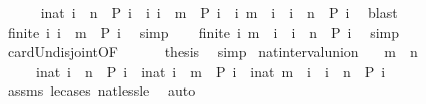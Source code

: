 \begin{isabellebody}
\ {}{\isacharcolon}\isanewline
\ \ \ \ {\isacartoucheopen}{\isacharbraceleft}i{\isacharcolon}{\isacharcolon}nat{\isachardot}\ i\ {\isacharless}\ n\ {\isasymand}\ P\ i{\isacharbraceright}\ {\isacharequal}\ {\isacharbraceleft}i{\isachardot}\ i\ {\isacharless}\ m\ {\isasymand}\ P\ i{\isacharbraceright}\ {\isasymunion}\ {\isacharbraceleft}i{\isachardot}\ m\ {\isasymle}\ i\ {\isasymand}\ i\ {\isacharless}\ n\ {\isasymand}\ P\ i{\isacharbraceright}{\isacartoucheclose}\ \isamarkupfalse%
\ blast\isanewline
\ \ \isamarkupfalse%
\ {}{\isacharcolon}{\isacartoucheopen}finite\ {\isacharbraceleft}i{\isachardot}\ i\ {\isacharless}\ m\ {\isasymand}\ P\ i{\isacharbraceright}{\isacartoucheclose}\ \isamarkupfalse%
\ simp\isanewline
\ \ \isamarkupfalse%
\ {}{\isacharcolon}{\isacartoucheopen}finite\ {\isacharbraceleft}i{\isachardot}\ m\ {\isasymle}\ i\ {\isasymand}\ i\ {\isacharless}\ n\ {\isasymand}\ P\ i{\isacharbraceright}{\isacartoucheclose}\ \isamarkupfalse%
\ simp\isanewline
\ \ \isamarkupfalse%
\ card{\isacharunderscore}Un{\isacharunderscore}disjoint{\isacharbrackleft}OF\ {}\ {}\ {}{\isacharbrackright}\ {}\ \isamarkupfalse%
\ {\isacharquery}thesis\ \isamarkupfalse%
\ simp\isanewline
{}\isamarkupfalse%
%
\endisatagproof
{\isafoldproof}%
%
\isadelimproof
\isanewline
%
\endisadelimproof
\isanewline
\isanewline
{}\isamarkupfalse%
\ nat{\isacharunderscore}interval{\isacharunderscore}union{\isacharcolon}\isanewline
\ \ \ {\isacartoucheopen}m\ {\isasymle}\ n{\isacartoucheclose}\isanewline
\ \ \ \ \ {\isacartoucheopen}{\isacharbraceleft}i{\isacharcolon}{\isacharcolon}nat{\isachardot}\ i\ {\isasymle}\ n\ {\isasymand}\ P\ i{\isacharbraceright}\ {\isacharequal}\ {\isacharbraceleft}i{\isacharcolon}{\isacharcolon}nat{\isachardot}\ i\ {\isasymle}\ m\ {\isasymand}\ P\ i{\isacharbraceright}\ {\isasymunion}\ {\isacharbraceleft}i{\isacharcolon}{\isacharcolon}nat{\isachardot}\ m\ {\isacharless}\ i\ {\isasymand}\ i\ {\isasymle}\ n\ {\isasymand}\ P\ i{\isacharbraceright}{\isacartoucheclose}\isanewline
%
\isadelimproof
%
\endisadelimproof
%
\isatagproof
{}\isamarkupfalse%
\ assms\ le{\isacharunderscore}cases\ nat{\isacharunderscore}less{\isacharunderscore}le\ \isamarkupfalse%
\ auto%
\endisatagproof
{\isafoldproof}%
%
\isadelimproof
\isanewline
%
\endisadelimproof
\isanewline
{}\isamarkupfalse%

\end{isabellebody}
